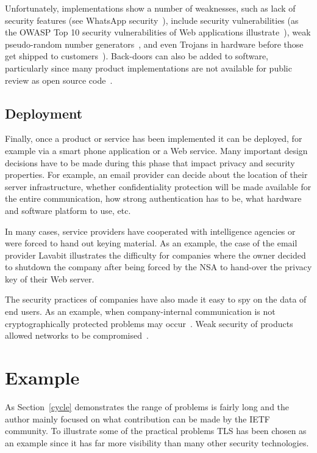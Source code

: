 \documentclass[peerreview, a4paper, 7pt]{IEEEtran}
\begin{document}
Unfortunately, implementations show a number of weaknesses, such as lack of security features (see WhatsApp security~\cite{WhatsApp}), include security vulnerabilities (as the OWASP Top 10 security vulnerabilities of Web applications illustrate~\cite{OWASP}), weak pseudo-random number generators~\cite{Heninger}, and even Trojans in hardware before those get shipped to customers~\cite{Larson,Becker}). Back-doors can also be added to software, particularly since many product implementations are not available for public review as open source code~\cite{NYT}.

\subsection{Deployment}

Finally, once a product or service has been implemented it can be deployed, for example via a smart phone application or a Web service. Many important design decisions have to be made during this phase that impact privacy and security properties. For example, an email provider can decide about the location of their server infrastructure, whether confidentiality protection will be made available for the entire communication, how strong authentication has to be, what hardware and software platform to use, etc. 

In many cases, service providers have cooperated with intelligence agencies or were forced to hand out keying material. As an example, the case of the email provider Lavabit illustrates the difficulty for companies where the owner decided to shutdown the company after being forced by the NSA to hand-over the privacy key of their Web server. 

The security practices of companies have also made it easy to spy on the data of end users. As an example, when company-internal communication is not cryptographically protected problems may occur~\cite{Greenwald,Gellman}. Weak security of products allowed networks to be compromised~\cite{Zetter}.

\section{Example}

As Section~\ref{cycle} demonstrates the range of problems is fairly long and the author mainly focused on what contribution can be made by the IETF community. To illustrate some of the practical problems TLS has been chosen as an example since it has far more visibility than many other security technologies. 
\end{document}
